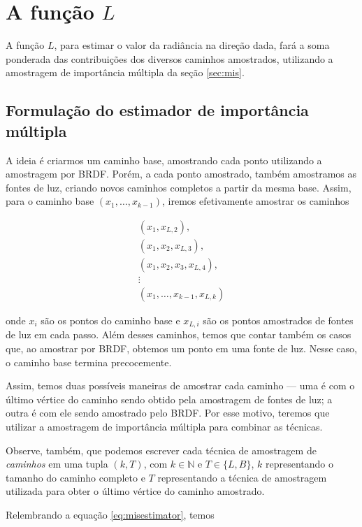 \section{A função $L$}

A função $L$, para estimar o valor da radiância na direção dada, fará a soma
ponderada das contribuições dos diversos caminhos amostrados, utilizando a
amostragem de importância múltipla da seção \ref{sec:mis}.

\subsection{Formulação do estimador de importância múltipla}

A ideia é criarmos um caminho base, amostrando cada ponto utilizando a
amostragem por BRDF. Porém, a cada ponto amostrado, também amostramos as fontes
de luz, criando novos caminhos completos a partir da mesma base. Assim, para o
caminho base $(x_1, \ldots, x_{k - 1})$, iremos efetivamente amostrar os caminhos

\begin{gather*}
  (x_1, x_{L,2}), \\
  (x_1, x_2, x_{L,3}), \\
  (x_1, x_2, x_3, x_{L,4}), \\
  \vdots \\
  (x_1, \ldots, x_{k-1}, x_{L,k})
\end{gather*}

onde $x_i$ são os pontos do caminho base e $x_{L,i}$ são os pontos amostrados
de fontes de luz em cada passo. Além desses caminhos, temos que contar também
os casos que, ao amostrar por BRDF, obtemos um ponto em uma fonte de luz.
Nesse caso, o caminho base termina precocemente.

Assim, temos duas possíveis maneiras de amostrar cada caminho --- uma é com o
último vértice do caminho sendo obtido pela amostragem de fontes de luz; a
outra é com ele sendo amostrado pelo BRDF. Por esse motivo, teremos que
utilizar a amostragem de importância múltipla para combinar as técnicas.

Observe, também, que podemos escrever cada técnica de amostragem de
\emph{caminhos} em uma tupla $(k, T)$, com $k \in \mathbb{N}$ e $T \in  \{L,
B\}$, $k$ representando o tamanho do caminho completo e $T$ representando a
técnica de amostragem utilizada para obter o último vértice do caminho
amostrado.

Relembrando a equação \ref{eq:misestimator}, temos

